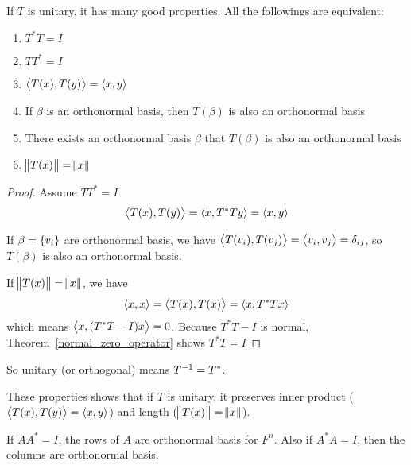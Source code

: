 If $T$ is unitary, it has many good properties. All the followings are equivalent:
\begin{enumerate}
    \item $T^*T = I$
    \item $TT^* = I$
    \item $\left\langle \displaystyle T(x), T(y) \right\rangle = \left\langle \displaystyle x, y \right\rangle$
    \item If $\beta$ is an orthonormal basis, then $T(\beta)$ is also an orthonormal basis
    \item There exists an orthonormal basis $\beta$ that $T(\beta)$ is also an orthonormal basis
    \item $\norm{T(x)} = \norm{x}$
\end{enumerate}
\begin{proof}
    Assume $TT^* = I$
    \begin{equation*}
        \left\langle \displaystyle T(x), T(y) \right\rangle = \left\langle \displaystyle x, T^*Ty \right\rangle = \left\langle \displaystyle x, y \right\rangle
    \end{equation*}
    
    If $\beta = \set{v_i}$ are orthonormal basis, we have $\left\langle \displaystyle T(v_i), T(v_j) \right\rangle = \left\langle \displaystyle v_i, v_j \right\rangle = \delta_{ij}$, so $T(\beta)$ is also an orthonormal basis.
    
    If $\norm{T(x)} = \norm{x}$, we have 
    \begin{equation*}
        \left\langle \displaystyle x, x \right\rangle = \left\langle \displaystyle T(x), T(x) \right\rangle = \left\langle \displaystyle x, T^*Tx \right\rangle
    \end{equation*}
    which means $\left\langle \displaystyle x, (T^*T - I)x \right\rangle = 0$. Because $T^*T - I$ is normal, Theorem~\ref{normal_zero_operator} shows $T^*T = I$
\end{proof}

So unitary (or orthogonal) means ${T}^{-1} = T^*$.

These properties shows that if $T$ is unitary, it preserves inner product ($\left\langle \displaystyle T(x), T(y) \right\rangle = \left\langle \displaystyle x, y \right\rangle$) and length ($\norm{T(x)} = \norm{x}$).


If $AA^* = I$, the rows of $A$ are orthonormal basis for $F^n$. Also if $A^*A = I$, then the columns are orthonormal basis.


